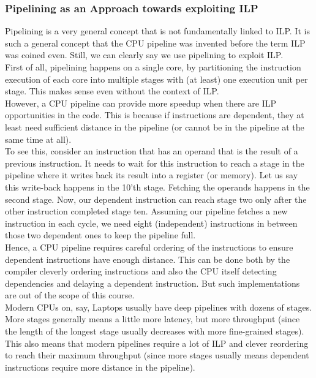 \documentclass[main.tex]{subfiles}
\begin{document}
\subsubsection{Pipelining as an Approach towards exploiting ILP}
Pipelining is a very general concept that is not fundamentally linked to ILP. It is such a general concept that the CPU pipeline was invented before the term ILP was coined even. Still, we can clearly say we use pipelining to exploit ILP.\\
First of all, pipelining happens on a single core, by partitioning the instruction execution of each core into multiple stages with (at least) one execution unit per stage. This makes sense even without the context of ILP.\\[3mm]
However, a CPU pipeline can provide more speedup when there are ILP opportunities in the code. This is because if instructions are dependent, they at least need sufficient distance in the pipeline (or cannot be in the pipeline at the same time at all).\\
To see this, consider an instruction that has an operand that is the result of a previous instruction. It needs to wait for this instruction to reach a stage in the pipeline where it writes back its result into a register (or memory). Let us say this write-back happens in the 10'th stage. Fetching the operands happens in the second stage. Now, our dependent instruction can reach stage two only after the other instruction completed stage ten. Assuming our pipeline fetches a new instruction in each cycle, we need eight (independent) instructions in between those two dependent ones to keep the pipeline full.\\[3mm]
Hence, a CPU pipeline requires careful ordering of the instructions to ensure dependent instructions have enough distance. This can be done both by the compiler cleverly ordering instructions and also the CPU itself detecting dependencies and delaying a dependent instruction. But such implementations are out of the scope of this course.\\[3mm]
Modern CPUs on, say, Laptops usually have deep pipelines with dozens of stages. More stages generally means a little more latency, but more throughput (since the length of the longest stage usually decreases with more fine-grained stages). This also means that modern pipelines require a lot of ILP and clever reordering to reach their maximum throughput (since more stages usually means dependent instructions require more distance in the pipeline).
\end{document}
